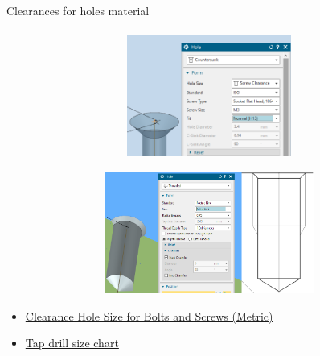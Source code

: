 \documentclass[aspectratio=169]{beamer}
\begin{document}
\begin{frame}[t]{Clearances for holes material}
\framesubtitle{}
        \vspace{-0.4cm}
        \begin{figure}[H]
            \begin{subfigure}[t]{0.48\textwidth}
                \centering\includegraphics[height=4cm,width=1\textwidth,keepaspectratio]{nx_countersunk.png}
                \label{fig:nx_countersunk.png}
            \end{subfigure}
            \begin{subfigure}[t]{0.48\textwidth}
                \centering\includegraphics[height=4cm,width=1\textwidth,keepaspectratio]{nx_thread.png}
                \label{fig:nx_thread.png}
            \end{subfigure}
        \end{figure}

        \begin{itemize}
            \item \href{https://engineersbible.com/clearance-hole-metric/}{Clearance Hole Size for Bolts and Screws (Metric)}
            \item \href{https://www.machiningdoctor.com/charts/metric-thread-charts/}{Tap drill size chart}
        \end{itemize}
\end{frame}
\end{document}
